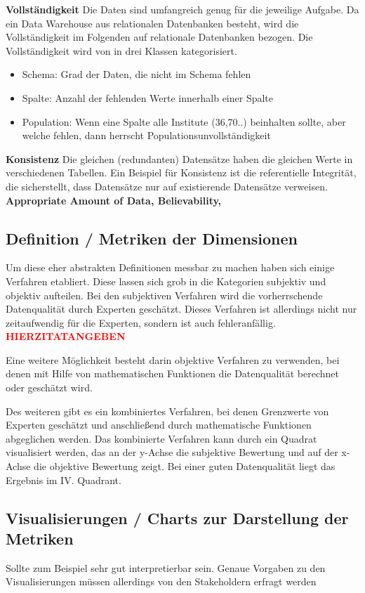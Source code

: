 \textbf{Vollständigkeit}
Die Daten sind umfangreich genug für die jeweilige Aufgabe. \cite{wang1996} 
Da ein Data Warehouse aus relationalen Datenbanken besteht, wird die Vollständigkeit im Folgenden auf relationale Datenbanken bezogen.
Die Vollständigkeit wird von \cite{pipino2002} in drei Klassen kategorisiert.
\begin{itemize}
 \item Schema: Grad der Daten, die nicht im Schema fehlen
 \item Spalte: Anzahl der fehlenden Werte innerhalb einer Spalte
 \item Population: Wenn eine Spalte alle Institute (36,70..) beinhalten sollte, aber welche fehlen, dann herrscht Populationsunvollständigkeit
\end{itemize}
\textbf{Konsistenz}
Die gleichen (redundanten) Datensätze haben die gleichen Werte in verschiedenen Tabellen. 
Ein Beispiel für Konsistenz ist die referentielle Integrität, die sicherstellt, dass Datensätze nur auf existierende Datensätze verweisen.
\\ \textbf{Appropriate Amount of Data, Believability, }


\subsection{Definition / Metriken der Dimensionen}
Um diese eher abstrakten Definitionen messbar zu machen haben sich einige Verfahren etabliert.
Diese lassen sich grob in die Kategorien subjektiv und objektiv aufteilen. \cite{pipino2002}
Bei den subjektiven Verfahren wird die vorherrschende Datenqualität durch Experten geschätzt. 
Dieses Verfahren ist allerdings nicht nur zeitaufwendig für die Experten, sondern ist auch fehleranfällig. \textcolor{red}{\textbf{HIERZITATANGEBEN}} \cite{}

Eine weitere Möglichkeit besteht darin objektive Verfahren zu verwenden, bei denen mit Hilfe von mathematischen Funktionen die Datenqualität berechnet oder geschätzt wird. 

Des weiteren gibt es ein kombiniertes Verfahren, bei denen Grenzwerte von Experten geschätzt und anschließend durch mathematische Funktionen abgeglichen werden. 
Das kombinierte Verfahren kann durch ein Quadrat visualisiert werden, das an der y-Achse die subjektive Bewertung und auf der x-Achse die objektive Bewertung zeigt. 
Bei einer guten Datenqualität liegt das Ergebnis im IV. Quadrant. \cite{pipino2002}



\subsection{Visualisierungen / Charts zur Darstellung der Metriken}
Sollte zum Beispiel sehr gut interpretierbar sein.
Genaue Vorgaben zu den Visualisierungen müssen allerdings von den Stakeholdern erfragt werden



